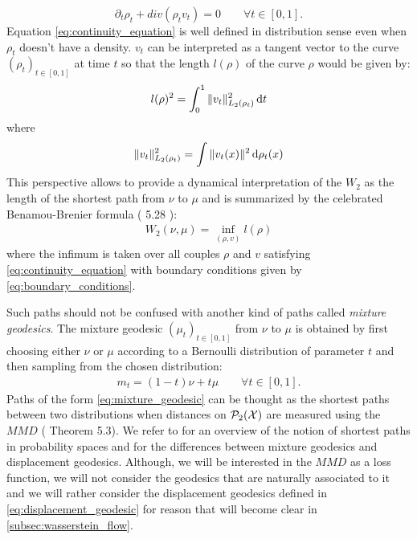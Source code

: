 \begin{equation}\label{eq:continuity_equation}
	\partial_t \rho_t + div(\rho_t v_t ) = 0 \qquad \forall t\in[0,1].
\end{equation}
Equation \cref{eq:continuity_equation} is well defined in distribution sense even when $\rho_t$ doesn't have a density. $v_t$ can be interpreted as a tangent vector to the curve $(\rho_t)_{t\in[0,1]}$ at time $t$ so that the length $l(\rho)$ of the curve $\rho$ would be given by:
\begin{equation}
	l(\rho)^2 = \int_0^1 \Vert v_t \Vert^2_{L_2(\rho_t)} \mathop{}\!\mathrm{d} t
\end{equation}
where \[
\Vert v_t \Vert^2_{L_2(\rho_t)} =  \int \Vert v_t(x) \Vert^2 \mathop{}\!\mathrm{d} \rho_t(x)
\]
This perspective allows to provide a dynamical interpretation of the $W_2$ as the length  of the shortest path from $\nu$ to $\mu$ and is summarized by the celebrated Benamou-Brenier formula (\cite{Santambrogio:2015} 5.28 ):
\begin{align}\label{eq:benamou-brenier-formula}
	W_2(\nu,\mu) = \inf_{(\rho,v)} l(\rho)
\end{align}
where the infimum is taken  over all couples  $\rho$ and $v$ satisfying  \cref{eq:continuity_equation}  with boundary conditions given by \cref{eq:boundary_conditions}.

\begin{remark}
Such paths should not be confused with another kind of paths called \textit{mixture geodesics}. The mixture geodesic $(\mu_t)_{t\in[0,1]}$ from $\nu$ to $\mu$ is obtained by first choosing either $\nu$ or $\mu$ according to a Bernoulli distribution of parameter $t$ and then sampling from the chosen distribution:
\begin{align}\label{eq:mixture_geodesic}
m_t = (1-t)\nu + t\mu \qquad \forall t \in [0,1].
\end{align}
Paths of the form \cref{eq:mixture_geodesic} can be thought as the shortest paths between two distributions when distances on $\mathcal{P}_2({{\mathcal X}})$ are measured using the $MMD$ (\cite{Bottou:2017} Theorem 5.3). We refer to \cite{Bottou:2017} for an overview of the notion of shortest paths in probability spaces and for the differences between mixture geodesics and displacement geodesics.
Although, we will be interested in the $MMD$ as a loss function, we will not consider the geodesics that are naturally associated to it and we will rather consider the displacement geodesics defined in \cref{eq:displacement_geodesic} for reason that will become clear in \cref{subsec:wasserstein_flow}.
\end{remark}



